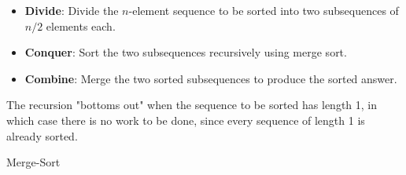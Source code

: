 
      \begin{itemize}
        \item \textbf{Divide}: Divide the $n$-element sequence to be sorted into two
          subsequences of $n / 2$ elements each.
        \item \textbf{Conquer}: Sort the two subsequences recursively using merge sort.
        \item \textbf{Combine}: Merge the two sorted subsequences to produce the sorted
          answer.
      \end{itemize}
      \par The recursion "bottoms out" when the sequence to be sorted has length 1, in which
      case there is no work to be done, since every sequence of length 1 is already sorted.

      \begin{algorithm}
        \caption{Merge-Sort}
        \begin{algorithmic}[1]
          \Statex
             
            \ENDFOR
            \ENDFOR
              \ELSE
              \ENDIF
            \ENDFOR
          \EndFunction
          \State
            \ENDIF
          \EndFunction
        \end{algorithmic}
      \end{algorithm}

